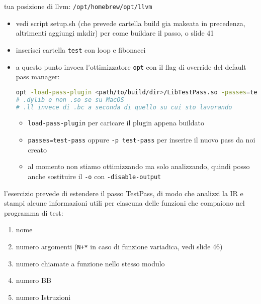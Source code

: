 \begin{emphasize}
    tua posizione di llvm: \lstinline|/opt/homebrew/opt/llvm|
\end{emphasize}

\begin{emphasize-blue}
    \begin{itemize}
      \item vedi script setup.sh (che prevede cartella build gia makeata in precedenza, altrimenti aggiungi mkdir) per come buildare il passo, o slide 41
      \item inserisci cartella \lstinline|test| con loop e fibonacci
      \item a questo punto invoca l'ottimizzatore \lstinline|opt| con il flag di override del default pass manager:
        \begin{lstlisting}[language=bash]
opt -load-pass-plugin <path/to/build/dir>/LibTestPass.so -passes=test-pass test/Loop.bc -o test/LoopTestPass.bc
# .dylib e non .so se su MacOS
# .ll invece di .bc a seconda di quello su cui sto lavorando\end{lstlisting}
       \begin{itemize}
         \item \lstinline|load-pass-plugin| per caricare il plugin appena buildato
         \item \lstinline|passes=test-pass| oppure \lstinline|-p test-pass| per inserire il nuovo pass da noi creato
         \item al momento non stiamo ottimizzando ma solo analizzando, quindi posso anche sostituire il \lstinline|-o| con \lstinline|-disable-output|
       \end{itemize}
        
    \end{itemize}
    
\end{emphasize-blue}

l'esercizio prevede di estendere il passo TestPass, di modo che analizzi la IR e stampi alcune informazioni utili per ciascuna delle funzioni che compaiono nel programma di test:
\begin{enumerate}
  \item nome
  \item numero argomenti (\lstinline|N+*| in caso di funzione variadica, vedi slide 46)
  \item numero chiamate a funzione nello stesso modulo
  \item numero BB
  \item numero Istruzioni
\end{enumerate}

